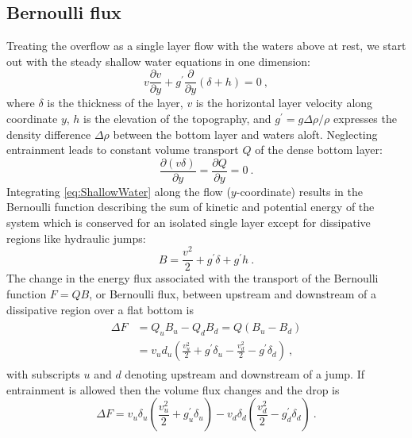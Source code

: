 \documentclass{ametsocV6.1}
\begin{document}
\subsection{Bernoulli flux}\label{sec:Bernoulli}
Treating the overflow as a single layer flow with the waters above at rest, we start out with the steady shallow water equations in one dimension:
\begin{equation}
    v \frac{\partial v}{\partial y} + g^\prime \frac{\partial}{\partial y} (\delta + h) = 0\ ,
    \label{eq:ShallowWater}
\end{equation}
where $\delta$ is the thickness of the layer, $v$ is the horizontal layer velocity along coordinate $y$, $h$ is the elevation of the topography, and $g^\prime=g \Delta \rho / \rho$ expresses the density difference $\Delta \rho$ between the bottom layer and waters aloft.
Neglecting entrainment leads to constant volume transport $Q$ of the dense bottom layer:
\begin{equation}
\frac{\partial (v \delta)}{\partial y} = \frac{\partial Q}{\partial y} = 0\ .
\end{equation}
Integrating \eqref{eq:ShallowWater} along the flow ($y$-coordinate) results in the Bernoulli function describing the sum of kinetic and potential energy of the system which is conserved for an isolated single layer except for dissipative regions like hydraulic jumps:
\begin{equation}
    B = \frac{v^2}{2} + g^\prime \delta + g^\prime h\ .
\end{equation}
The change in the energy flux associated with the transport of the Bernoulli function $F=Q B$, or Bernoulli flux, between upstream and downstream of a dissipative region over a flat bottom is
\begin{align}
\begin{split}
\Delta F &= Q_u B_u -Q_d B_d = Q(B_u - B_d) \\
    &= v_u d_u (\frac{v_u^2}{2} + g^\prime \delta_u - \frac{v_d^2}{2} -g^\prime \delta_d)\ ,
\end{split}
\label{eq:BernoulliNoEntrainment}
\end{align}
with subscripts $u$ and $d$ denoting upstream and downstream of a jump.
If entrainment is allowed then the volume flux changes and the drop is
\begin{equation}
\Delta F = v_u \delta_u (\frac{v_u^2}{2} + g^\prime_u \delta_u) - v_d \delta_d(\frac{v_d^2}{2} -g^\prime_d \delta_d)\ .
\label{eq:BernoulliEntrainment}
\end{equation}
\end{document}
